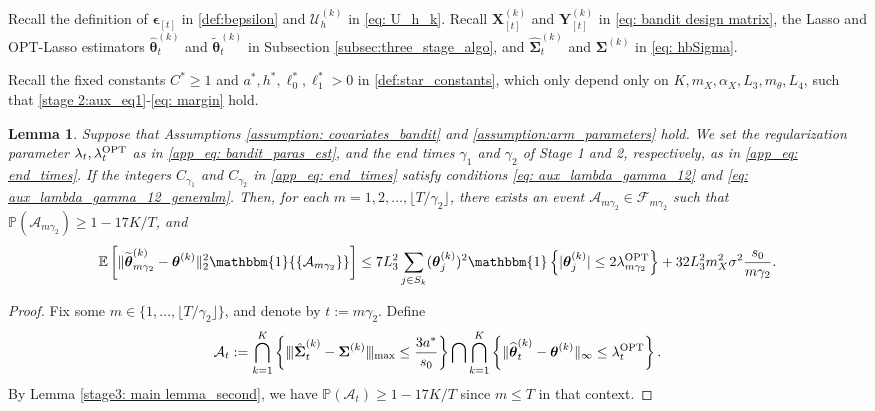 \documentclass[aos,preprint]{imsart}
\theoremstyle{plain}
\newtheorem{lemma}[theorem]{Lemma}
\theoremstyle{definition}
\newcommand{\btheta}{\boldsymbol{\theta}}
\newcommand{\bd}[1]{\boldsymbol{#1}}
\newcommand{\hbtheta}{\widehat{\boldsymbol{\theta}}}
\newcommand{\idf}{\mathbbm{1}}
\newcommand{\bX}{\boldsymbol{X}}
\newcommand{\bSigma}{\boldsymbol{\Sigma}}
\newcommand{\mn}{\vert\kern-0.25ex \vert\kern-0.25ex \vert}
\newcommand{\bY}{\boldsymbol{Y}}
\newcommand{\tbtheta}{\widetilde{\boldsymbol{\theta}}}
\newcommand{\hdlambda}{\lambda^{\textup{OPT}}}
\newcommand{\hbSigma}{\hat{\boldsymbol{\Sigma}}}
\newcommand{\bepsilon}{\bd{\epsilon}}
\newcommand{\cF}{\mathcal{F}}
\newcommand{\Exp}{\mathbb{E}}
\newcommand{\Pro}{\mathbb{P}}
\begin{document}
\begin{appendix}
  
Recall the definition of $\bepsilon_{[t]}$ in \eqref{def:bepsilon} and $\mathcal{U}_h^{(k)}$ in \eqref{eq: U_h_k}.  Recall 
$\bX_{[t]}^{(k)}$ and $\bY_{[t]}^{(k)}$ in \eqref{eq: bandit design matrix}, the Lasso and OPT-Lasso estimators $\hbtheta_{t}^{(k)}$ and $\tbtheta_t^{(k)}$ in Subsection \ref{subsec:three_stage_algo}, and $\hbSigma^{(k)}_{t}$ and $\bSigma^{(k)}$ in \eqref{eq: hbSigma}.


Recall the fixed constants  $C^* \geq 1$ and $a^*, h^*, \ell_0^*, \ell_1^* > 0$  in \eqref{def:star_constants}, which only depend only on $K,  m_X, \alpha_X,  L_3, m_{\theta}, L_4$, such that \eqref{stage 2:aux_eq1}-\eqref{eq: margin} hold.
\begin{lemma}  \label{stage3: main lemma}
Suppose that Assumptions \ref{assumption: covariates_bandit} and \ref{assumption:arm_parameters} hold. We set the regularization parameter $\lambda_t,\hdlambda_t$ as in \eqref{app_eq: bandit_paras_est}, and the end times $\gamma_1$ and $\gamma_2$ of Stage 1 and 2, respectively, as in \eqref{app_eq: end_times}.
If the integers $C_{\gamma_1}$ and $C_{\gamma_2}$ in \eqref{app_eq: end_times} satisfy conditions \eqref{eq: aux_lambda_gamma_12} and \eqref{eq: aux_lambda_gamma_12_generalm}.
Then, for each $m = 1,2,\ldots, \lfloor T/\gamma_2 \rfloor$, there exists an event $\mathcal{A}_{m\gamma_2}\in \cF_{m\gamma_2}$ such that $\Pro(\mathcal{A}_{m\gamma_2})\ge 1-17K/T$, and
\begin{equation*}
    \Exp\left[\|\tbtheta_{m\gamma_2}^{(k)}-\btheta^{(k)} \|_2^2 \idf{\{\mathcal{A}_{m\gamma_2}\}} \right] \le 7L_3^2 \sum_{j\in S_k} (\btheta^{(k)}_j)^2 \idf\left\{|\btheta^{(k)}_j| \le 2\hdlambda_{m\gamma_2} \right\} + 32L_3^2 m_X^2 \sigma^2 \frac{ s_0}{m\gamma_2}.
\end{equation*}
\end{lemma}

\begin{proof}
Fix some $m \in \{1,\ldots, \lfloor T/\gamma_2 \rfloor\}$, and denote by $t := m\gamma_2$. Define
\begin{align*}
\mathcal{A}_{t} :=  \bigcap_{k=1}^{K}\left\{\mn\hbSigma_{t}^{(k)}-\bSigma^{(k)}\mn_{\textup{max}} \le  \frac{3 a^*}{s_0} \right\}  \bigcap \bigcap_{k = 1}^{K}\left\{\|\hbtheta_{t}^{(k)} - \btheta^{(k)}\|_{\infty} \leq  \hdlambda_{t}\right\}.
\end{align*}
By Lemma \ref{stage3: main lemma_second}, we have  $\Pro(\mathcal{A}_{t})\ge 1-17K/T$ since $m \leq T$ in that context.


\end{proof}
\end{appendix}
\end{document}
